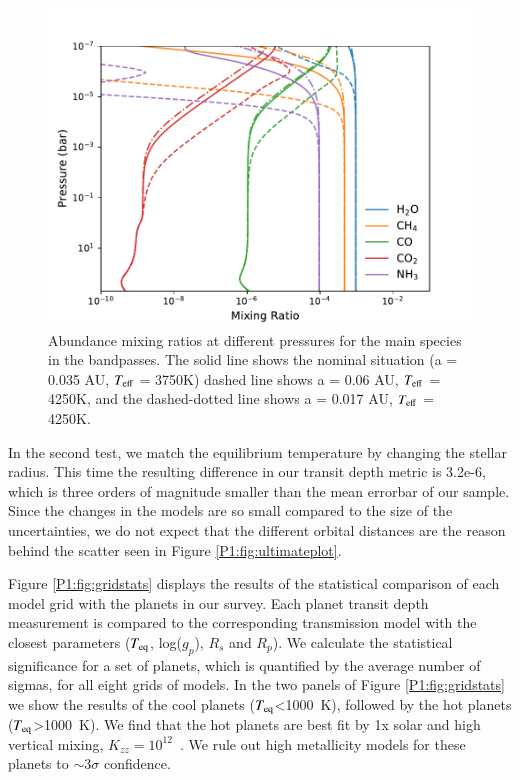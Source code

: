 \begin{figure}
    \centering
    \includegraphics[width=\linewidth]{a-test.pdf}
    \caption{Abundance mixing ratios at different pressures for the main species in the \spitzer bandpasses. The solid line shows the nominal situation (a = 0.035 AU, $T_{\rm eff}$ = 3750K) dashed line shows a = 0.06 AU, $T_{\rm eff}$ = 4250K, and the dashed-dotted line shows a = 0.017 AU, $T_{\rm eff}$ = 4250K.}
    \label{P1:fig:Tefftest}
\end{figure}

In the second test, we match the equilibrium temperature by changing the stellar radius. This time the resulting difference in our transit depth metric is 3.2e-6, which is three orders of magnitude smaller than the mean errorbar of our sample. Since the changes in the models are so small compared to the size of the uncertainties, we do not expect that the different orbital distances are the reason behind the scatter seen in Figure \ref{P1:fig:ultimateplot}.

Figure \ref{P1:fig:gridstats} displays the results of the statistical comparison of each model grid with the planets in our survey. Each planet transit depth measurement is compared to the corresponding transmission model with the closest parameters ($T_{\rm eq}$, log($g_p$), $R_s$ and $R_p$). We calculate the statistical significance for a set of planets, which is quantified by the average number of sigmas, for all eight grids of models. In the two panels of Figure \ref{P1:fig:gridstats} we show the results of the cool planets ($T_{\rm eq}$<1000~K), followed by the hot planets ($T_{\rm eq}$>1000~K). We find that the hot planets are best fit by 1x solar and high vertical mixing, $K_{zz} = 10^{12}$~\cmcms. We rule out high metallicity models for these planets to $\sim3\sigma$ confidence.

